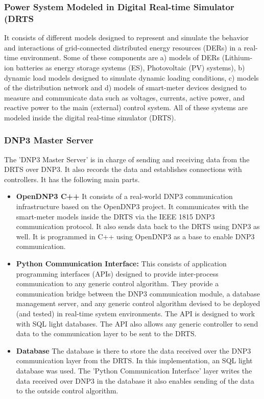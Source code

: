 \subsubsection{Power System Modeled in Digital Real-time Simulator (DRTS}
It consists of different models designed to represent and simulate the behavior and interactions of grid-connected distributed energy resources (DERs) in a real-time environment. Some of these components are a) models of DERs (Lithium-ion batteries as energy storage systems (ES), Photovoltaic (PV) systems), b) dynamic load models designed to simulate dynamic loading conditions,  c) models of the distribution network and d) models of smart-meter devices designed to measure and communicate data such as voltages, currents, active power, and reactive power to the main (external) control system. All of these systems are modeled inside the digital real-time simulator (DRTS). 

\subsubsection{DNP3 Master Server}
The 'DNP3 Master Server' is in charge of sending and receiving data from the DRTS over DNP3. It also records the data and establishes connections with controllers.  It has the following main parts.
\begin{itemize}
    \item \textbf{OpenDNP3 C++} It consists of a real-world DNP3 communication infrastructure based on the OpenDNP3 \cite{opendnp3_2020} project. It communicates with the smart-meter models inside the DRTS via the IEEE 1815 DNP3 communication protocol. It also sends data back to the DRTS using DNP3 as well. It is programmed in C++ using OpenDNP3 as a base to enable DNP3 communication.
    \item \textbf{Python Communication Interface:} This consists of application programming interfaces (APIs) designed to provide inter-process communication to any generic control algorithm. They provide a communication bridge between the DNP3 communication module, a database management server, and any generic control algorithm devised to be deployed (and tested) in real-time system environments. The API is designed to work with SQL light databases. The API also allows any generic controller to send data to the communication layer to be sent to the DRTS.
    \item \textbf{Database} The database is there to store the data received over the DNP3 communication layer from the DRTS. In this implementation, an SQL light database was used. The 'Python Communication Interface' layer writes the data received over DNP3 in the database it also enables sending of the data to the outside control algorithm.
\end{itemize}

